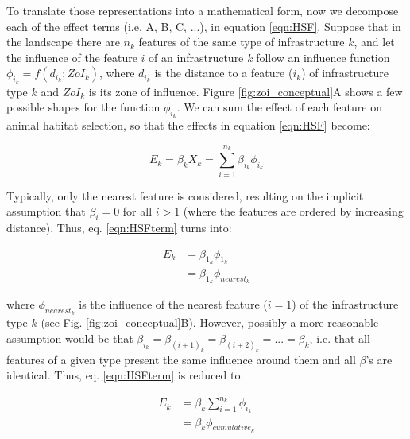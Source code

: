 \documentclass[titlepage]{article}
\begin{document}
{To translate those representations into a mathematical form, now we decompose each of the effect terms (i.e. A, B, C, ...), in equation \ref{eqn:HSF}. Suppose that in the landscape there are $n_k$ features of the same type of infrastructure $k$, and let the influence of the feature $i$ of an infrastructure \textit{k} follow an influence function \citep[or ``weighting function", ][]{miguet_how_2017} $\phi_{i_k} = f(d_{i_k}; ZoI_k)$, where $d_{i_k}$ is the distance to a feature ($i_k$) of infrastructure type $k$ and $ZoI_k$ is its zone of influence. Figure \ref{fig:zoi_conceptual}A shows a few possible shapes for the function $\phi_{i_k}$. We can sum the effect of each feature on animal habitat selection, so that the effects in equation \ref{eqn:HSF} become:

\begin{equation}
\label{eqn:HSFterm}
    E_k = \beta_k X_k = \sum_{i=1}^{n_k} \beta_{i_k} \phi_{i_k}
\end{equation}

Typically, only the nearest feature is considered, resulting on the implicit assumption that $\beta_i = 0$ for all $i > 1$ (where the features are ordered by increasing distance). Thus, eq. \ref{eqn:HSFterm} turns into:

\begin{equation}
\label{eqn:HSFnearest}
\begin{split}
    E_k & = \beta_{1_k} \phi_{1_k} \\
        & = \beta_{1_k} \phi_{nearest_k}
\end{split}                
\end{equation}

where $\phi_{nearest_k}$ is the influence of the nearest feature ($i = 1$) of the infrastructure type $k$ (see Fig. \ref{fig:zoi_conceptual}B). However, possibly a more reasonable assumption would be that $\beta_{i_k} = \beta_{{(i+1)}_k} = \beta_{{(i+2)}_k} = ... = \beta_k$, i.e. that all features of a given type present the same influence around them and all $\beta$'s are identical. Thus, eq. \ref{eqn:HSFterm} is reduced to:

\begin{equation}
\label{eqn:HSFcuminf}
\begin{split}
    E_k & = \beta_k \sum_{i=1}^{n_k} \phi_{i_k} \\
        & = \beta_k \phi_{cumulative_k}
\end{split}
\end{equation}

}
\end{document}
